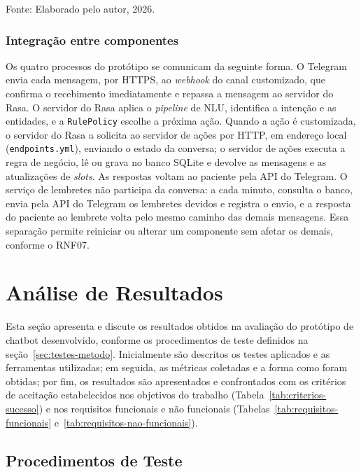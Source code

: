 \documentclass[12pt,a4paper]{extarticle}
\begin{document}
\footnotesize{Fonte: Elaborado pelo autor, 2026.}

\normalsize
\subsubsection{Integração entre componentes}

Os quatro processos do protótipo se comunicam da seguinte forma. O Telegram envia cada mensagem, por HTTPS, ao \textit{webhook} do canal customizado, que confirma o recebimento imediatamente e repassa a mensagem ao servidor do Rasa. O servidor do Rasa aplica o \textit{pipeline} de NLU, identifica a intenção e as entidades, e a \texttt{RulePolicy} escolhe a próxima ação. Quando a ação é customizada, o servidor do Rasa a solicita ao servidor de ações por HTTP, em endereço local (\texttt{endpoints.yml}), enviando o estado da conversa; o servidor de ações executa a regra de negócio, lê ou grava no banco SQLite e devolve as mensagens e as atualizações de \textit{slots}. As respostas voltam ao paciente pela API do Telegram. O serviço de lembretes não participa da conversa: a cada minuto, consulta o banco, envia pela API do Telegram os lembretes devidos e registra o envio, e a resposta do paciente ao lembrete volta pelo mesmo caminho das demais mensagens. Essa separação permite reiniciar ou alterar um componente sem afetar os demais, conforme o RNF07.

\newpage

\section{Análise de Resultados}
\label{cap:resultados}

Esta seção apresenta e discute os resultados obtidos na avaliação do protótipo de chatbot desenvolvido, conforme os procedimentos de teste definidos na seção~\ref{sec:testes-metodo}. Inicialmente são descritos os testes aplicados e as ferramentas utilizadas; em seguida, as métricas coletadas e a forma como foram obtidas; por fim, os resultados são apresentados e confrontados com os critérios de aceitação estabelecidos nos objetivos do trabalho (Tabela~\ref{tab:criterios-sucesso}) e nos requisitos funcionais e não funcionais (Tabelas~\ref{tab:requisitos-funcionais} e~\ref{tab:requisitos-nao-funcionais}).

\subsection{Procedimentos de Teste}
\label{sec:proc_teste}
\end{document}
